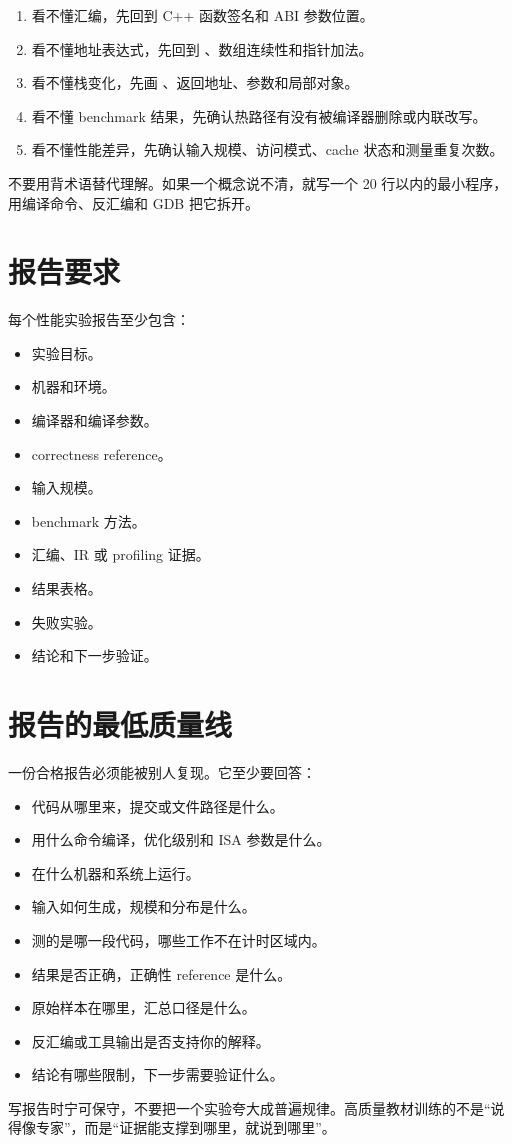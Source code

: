 \begin{enumerate}
  \item 看不懂汇编，先回到 C++ 函数签名和 ABI 参数位置。
  \item 看不懂地址表达式，先回到 、数组连续性和指针加法。
  \item 看不懂栈变化，先画 、返回地址、参数和局部对象。
  \item 看不懂 benchmark 结果，先确认热路径有没有被编译器删除或内联改写。
  \item 看不懂性能差异，先确认输入规模、访问模式、cache 状态和测量重复次数。
\end{enumerate}

不要用背术语替代理解。如果一个概念说不清，就写一个 20 行以内的最小程序，用编译命令、反汇编和 GDB 把它拆开。

\section*{报告要求}

每个性能实验报告至少包含：

\begin{itemize}
  \item 实验目标。
  \item 机器和环境。
  \item 编译器和编译参数。
  \item correctness reference。
  \item 输入规模。
  \item benchmark 方法。
  \item 汇编、IR 或 profiling 证据。
  \item 结果表格。
  \item 失败实验。
  \item 结论和下一步验证。
\end{itemize}

\section*{报告的最低质量线}

一份合格报告必须能被别人复现。它至少要回答：

\begin{itemize}
  \item 代码从哪里来，提交或文件路径是什么。
  \item 用什么命令编译，优化级别和 ISA 参数是什么。
  \item 在什么机器和系统上运行。
  \item 输入如何生成，规模和分布是什么。
  \item 测的是哪一段代码，哪些工作不在计时区域内。
  \item 结果是否正确，正确性 reference 是什么。
  \item 原始样本在哪里，汇总口径是什么。
  \item 反汇编或工具输出是否支持你的解释。
  \item 结论有哪些限制，下一步需要验证什么。
\end{itemize}

写报告时宁可保守，不要把一个实验夸大成普遍规律。高质量教材训练的不是“说得像专家”，而是“证据能支撑到哪里，就说到哪里”。
